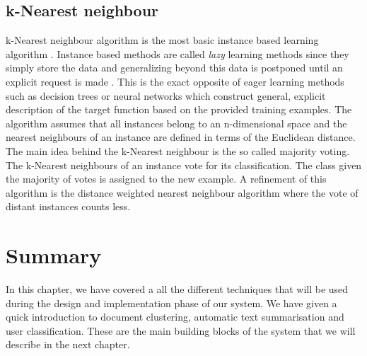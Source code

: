 \subsection{k-Nearest neighbour}
k-Nearest neighbour algorithm is the most basic instance based learning algorithm \citep{Mitchell1997}. Instance based methods are called \emph{lazy} learning methods since they simply store the data and generalizing beyond this data is postponed until an explicit request is made \citep{Maja}. This is the exact opposite of eager learning methods such as decision trees or neural networks which construct general, explicit description of the target function based on the provided training examples. The algorithm assumes that all instances belong to an n-dimensional space and the nearest neighbours of an instance are defined in terms of the Euclidean distance. The main idea behind the k-Nearest neighbour is the so called majority voting. The k-Nearest neighbours of an instance vote for its classification. The class given the majority of votes is assigned to the new example. A refinement of this algorithm is the distance weighted nearest neighbour algorithm where the vote of distant instances counts less.  

\section{Summary}
In this chapter, we have covered a all the different techniques that will be used during the design and implementation phase of our system. We have given a quick introduction to document clustering, automatic text summarisation and user classification. These are the main building blocks of the system that we will describe in the next chapter. 


